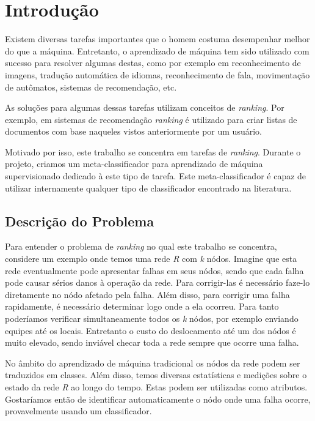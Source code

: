 \chapter{Introdução}

Existem diversas tarefas importantes que o homem costuma desempenhar melhor do que a máquina.
Entretanto, o aprendizado de máquina tem sido utilizado com sucesso para resolver algumas destas, como por exemplo em reconhecimento de imagens, tradução automática de idiomas, reconhecimento de fala, movimentação de autômatos, sistemas de recomendação, etc.

As soluções para algumas dessas tarefas utilizam conceitos de \textit{ranking}.
Por exemplo, em sistemas de recomendação \textit{ranking} é utilizado para criar listas de documentos com base naqueles vistos anteriormente por um usuário.

Motivado por isso, este trabalho se concentra em tarefas de \textit{ranking}.
Durante o projeto, criamos um meta-classificador para aprendizado de máquina supervisionado dedicado à este tipo de tarefa.
Este meta-classificador é capaz de utilizar internamente qualquer tipo de classificador encontrado na literatura.

\section{Descrição do Problema}

Para entender o problema de \textit{ranking} no qual este trabalho se concentra, considere um exemplo onde temos uma rede \textit{R} com \textit{k} nódos.
Imagine que esta rede eventualmente pode apresentar falhas em seus nódos, sendo que cada falha pode causar sérios danos à operação da rede.
Para corrigir-las é necessário faze-lo diretamente no nódo afetado pela falha.
Além disso, para corrigir uma falha rapidamente, é necessário determinar logo onde a ela ocorreu.
Para tanto poderíamos verificar simultaneamente todos os \textit{k} nódos, por exemplo enviando equipes até os locais.
Entretanto o custo do deslocamento até um dos nódos é muito elevado, sendo inviável checar toda a rede sempre que ocorre uma falha.

No âmbito do aprendizado de máquina tradicional os nódos da rede podem ser traduzidos em classes.
Além disso, temos diversas estatísticas e medições sobre o estado da rede \textit{R} ao longo do tempo.
Estas podem ser utilizadas como atributos.
Gostaríamos então de identificar automaticamente o nódo onde uma falha ocorre, provavelmente usando um classificador.


